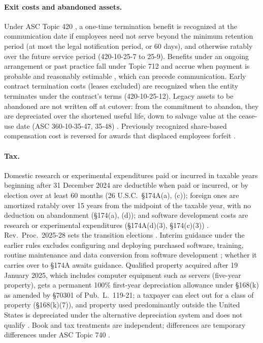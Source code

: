 \paragraph{Exit costs and abandoned assets.} Under ASC Topic 420 \citep{fasb2026asc420}, a one-time termination benefit is recognized at the communication date if employees need not serve beyond the minimum retention period (at most the legal notification period, or 60 days), and otherwise ratably over the future service period (420-10-25-7 to 25-9). Benefits under an ongoing arrangement or past practice fall under Topic 712 and accrue when payment is probable and reasonably estimable \citep{fasb2026asc712}, which can precede communication. Early contract termination costs (leases excluded) are recognized when the entity terminates under the contract's terms (420-10-25-12). Legacy assets to be abandoned are not written off at cutover: from the commitment to abandon, they are depreciated over the shortened useful life, down to salvage value at the cease-use date (ASC 360-10-35-47, 35-48) \citep{fasb2026asc360}. Previously recognized share-based compensation cost is reversed for awards that displaced employees forfeit \citep{fasb2016asu201609}.

\paragraph{Tax.} Domestic research or experimental expenditures paid or incurred in taxable years beginning after 31 December 2024 are deductible when paid or incurred, or by election over at least 60 months (26 U.S.C.~\S174A(a), (c)); foreign ones are amortized ratably over 15 years from the midpoint of the taxable year, with no deduction on abandonment (\S174(a), (d)); and software development costs are research or experimental expenditures (\S174A(d)(3), \S174(c)(3)) \citep{usc2026sec174a,usc2026sec174}. Rev.\ Proc.\ 2025-28 sets the transition elections \citep{irs2025revproc202528}. Interim guidance under the earlier rules excludes configuring and deploying purchased software, training, routine maintenance and data conversion from software development \citep{irs2023notice202363}; whether it carries over to \S174A awaits guidance. Qualified property acquired after 19 January 2025, which includes computer equipment such as servers (five-year property), gets a permanent 100\% first-year depreciation allowance under \S168(k) as amended by \S70301 of Pub.\ L.\ 119-21; a taxpayer can elect out for a class of property (\S168(k)(7)), and property used predominantly outside the United States is depreciated under the alternative depreciation system and does not qualify \citep{irs2026notice202611,usc2026sec168,cfr2026sec1168k2}. Book and tax treatments are independent; differences are temporary differences under ASC Topic 740 \citep{fasb2026asc740}.

